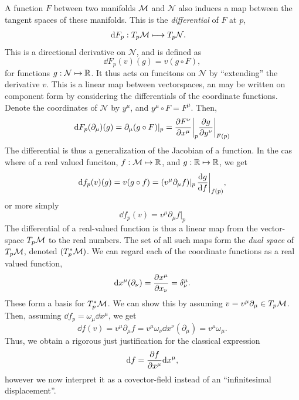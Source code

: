 A function $F$ between two manifolds $\mathcal{M}$ and $\mathcal N$ also induces a map between the tangent spaces of these manifolds.
This is the \emph{differential} of $F$ at $p$, 
%
\begin{align}
    \text{d} F_p: T_p \mathcal{M} & \longmapsto T_p \mathcal N.
\end{align}
%
This is a directional derivative on $\mathcal N$, and is defined as
%
\begin{equation}
    \dd F_p(v) (g) = v(g \circ F),
\end{equation}
%
for functions $g : \mathcal N \mapsto \mathbb{R}$.
It thus acts on funcitons on $\mathcal N$ by ``extending'' the derivative $v$.
This is a linear map between vectorspaces, an may be written on component form by considering the differentials of the coordinate functions.
Denote the coordinates of $\mathcal N$ by $y^\mu$, and $y^\mu \circ F = F^\mu$.
Then,
%
\begin{equation}
    \dd F_p (\partial_\mu) (g) = \partial_\mu (g \circ F) |_p 
    = \diffp{F^\nu}{x^\mu}\bigg |_p \diffp{g}{y^\nu} \bigg  |_{F(p)}
\end{equation}
%
The differential is thus a generalization of the Jacobian of a function.
In the cas where of a real valued funciton, $f: \mathcal{M} \mapsto \mathbb{R}$, and $g : \mathbb{R} \mapsto \mathbb{R}$, we get
%
\begin{equation}
    \dd f_p (v) (g) 
    = v(g \circ f) 
    = (v^\mu \partial_\mu f) |_p \, \diff{g}{f}\bigg  |_{f(p)},
\end{equation}
%
or more simply
%
\begin{equation}
    \dd f_p (v) = v^\mu \partial_\mu f |_p
\end{equation}
%
The differential of a real-valued function is thus a linear map from the vector-space $T_p \mathcal{M}$ to the real numbers.
The set of all such maps form the \emph{dual space} of $T_p \mathcal{M}$, denoted $(T_p^* \mathcal{M})$.
We can regard each of the coordinate functions as a real valued function,
%
\begin{equation}
    \dd x^\mu (\partial_\nu) = \diffp{x^\mu}{x_\nu} = \delta^\mu_\nu.
\end{equation}
%
These form a basis for $T^*_p \mathcal{M}$.
We can show this by assuming $v = v^\mu \partial_\mu \in T_p \mathcal{M}$.
Then, assuming $\dd f_p = \omega_\mu \dd x^\mu$, we get
%
\begin{equation}
    \dd f (v) = v^\mu \partial_\mu f = v^\mu \omega_\nu \dd x^\nu(\partial_\mu) = v^\mu \omega_\mu.
\end{equation}
%
Thus, we obtain a rigorous just justification for the classical expression 
%
\begin{equation}
    \dd f = \diffp{f}{x^\mu} \dd x^\mu,
\end{equation}
however we now interpret it as a covector-field instead of an ``infinitesimal displacement''.

